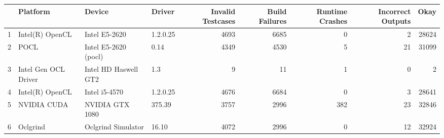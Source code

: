 \begin{tabular}{llllrrrrr}
\toprule
{} &              Platform &                Device &    Driver &  Invalid Testcases &  Build Failures &  Runtime Crashes &  Incorrect Outputs &   Okay \\
\midrule
1 &       Intel(R) OpenCL &         Intel E5-2620 &  1.2.0.25 &               4693 &            6685 &                0 &                  2 &  28624 \\
2 &                  POCL &  Intel E5-2620 (pocl) &      0.14 &               4349 &            4530 &                5 &                 21 &  31099 \\
3 &  Intel Gen OCL Driver &  Intel HD Haswell GT2 &       1.3 &                  9 &              11 &                1 &                  0 &      2 \\
4 &       Intel(R) OpenCL &         Intel i5-4570 &  1.2.0.25 &               4676 &            6684 &                0 &                  3 &  28641 \\
5 &           NVIDIA CUDA &       NVIDIA GTX 1080 &    375.39 &               3757 &            2996 &              382 &                 23 &  32846 \\
6 &              Oclgrind &    Oclgrind Simulator &     16.10 &               4072 &            2996 &                0 &                 12 &  32924 \\
\bottomrule
\end{tabular}
